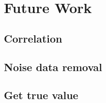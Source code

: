 \chapter{Future Work}

\section{Correlation}

\section{Noise data removal}

\section{Get true value}
